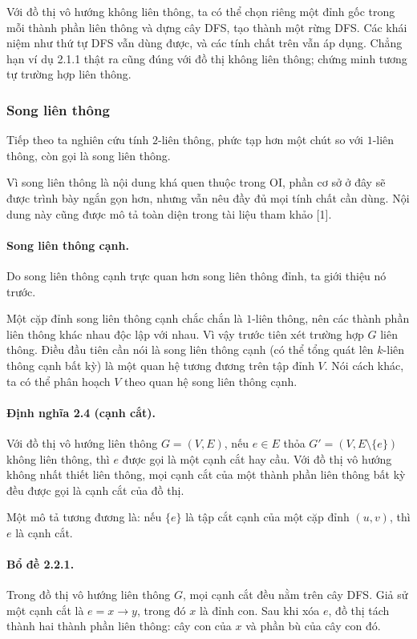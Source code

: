 \documentclass[11pt]{article}
\begin{document}
Với đồ thị vô hướng không liên thông, ta có thể chọn riêng một đỉnh gốc trong
mỗi thành phần liên thông và dựng cây DFS, tạo thành một rừng DFS. Các khái niệm
như thứ tự DFS vẫn dùng được, và các tính chất trên vẫn áp dụng. Chẳng hạn ví dụ
2.1.1 thật ra cũng đúng với đồ thị không liên thông; chứng minh tương tự trường
hợp liên thông.

\subsubsection{Song liên thông}

Tiếp theo ta nghiên cứu tính $2$-liên thông, phức tạp hơn một chút so với
$1$-liên thông, còn gọi là song liên thông.

Vì song liên thông là nội dung khá quen thuộc trong OI, phần cơ sở ở đây sẽ được
trình bày ngắn gọn hơn, nhưng vẫn nêu đầy đủ mọi tính chất cần dùng. Nội dung
này cũng được mô tả toàn diện trong tài liệu tham khảo [1].

\paragraph{Song liên thông cạnh.}
Do song liên thông cạnh trực quan hơn song liên thông đỉnh, ta giới thiệu nó
trước.

Một cặp đỉnh song liên thông cạnh chắc chắn là $1$-liên thông, nên các thành
phần liên thông khác nhau độc lập với nhau. Vì vậy trước tiên xét trường hợp
$G$ liên thông. Điều đầu tiên cần nói là song liên thông cạnh (có thể tổng quát
lên $k$-liên thông cạnh bất kỳ) là một quan hệ tương đương trên tập đỉnh $V$.
Nói cách khác, ta có thể phân hoạch $V$ theo quan hệ song liên thông cạnh.

\paragraph{Định nghĩa 2.4 (cạnh cắt).}
Với đồ thị vô hướng liên thông $G=(V,E)$, nếu $e\in E$ thỏa
$G'=(V,E\setminus\{e\})$ không liên thông, thì $e$ được gọi là một cạnh cắt hay
cầu. Với đồ thị vô hướng không nhất thiết liên thông, mọi cạnh cắt của một
thành phần liên thông bất kỳ đều được gọi là cạnh cắt của đồ thị.

Một mô tả tương đương là: nếu $\{e\}$ là tập cắt cạnh của một cặp đỉnh $(u,v)$,
thì $e$ là cạnh cắt.

\paragraph{Bổ đề 2.2.1.}
Trong đồ thị vô hướng liên thông $G$, mọi cạnh cắt đều nằm trên cây DFS. Giả sử
một cạnh cắt là $e=x\to y$, trong đó $x$ là đỉnh con. Sau khi xóa $e$, đồ thị
tách thành hai thành phần liên thông: cây con của $x$ và phần bù của cây con đó.
\end{document}

